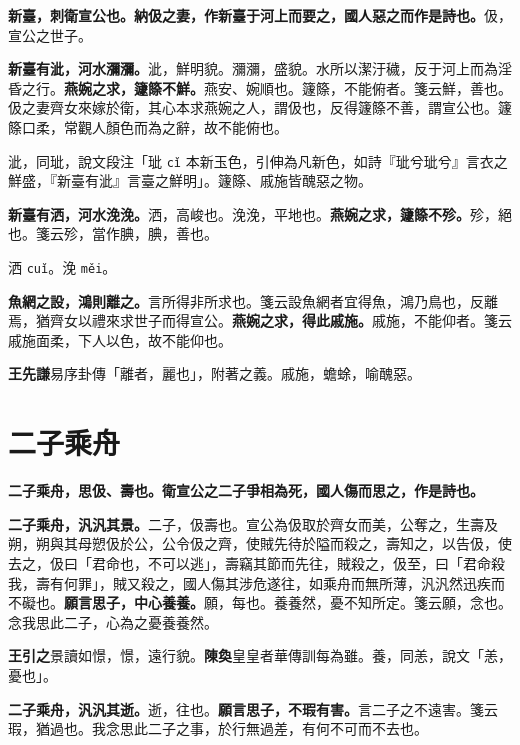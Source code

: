 
\textbf{新臺，刺衛宣公也。納伋之妻，作新臺于河上而要之，國人惡之而作是詩也。}{\footnotesize 伋，宣公之世子。}

\textbf{新臺有泚，河水瀰瀰。}{\footnotesize 泚，鮮明貌。瀰瀰，盛貌。水所以潔汙穢，反于河上而為淫昏之行。}\textbf{燕婉之求，籧篨不鮮。}{\footnotesize 燕安、婉順也。籧篨，不能俯者。箋云鮮，善也。伋之妻齊女來嫁於衛，其心本求燕婉之人，謂伋也，反得籧篨不善，謂宣公也。籧篨口柔，常觀人顏色而為之辭，故不能俯也。}

\begin{quoting}泚，同玼，說文段注「玼 \texttt{cǐ} 本新玉色，引伸為凡新色，如詩『玼兮玼兮』言衣之鮮盛，『新臺有泚』言臺之鮮明」。籧篨、戚施皆醜惡之物。\end{quoting}

\textbf{新臺有洒，河水浼浼。}{\footnotesize 洒，高峻也。浼浼，平地也。}\textbf{燕婉之求，籧篨不殄。}{\footnotesize 殄，絕也。箋云殄，當作腆，腆，善也。}

\begin{quoting}洒 \texttt{cuǐ}。浼 \texttt{měi}。\end{quoting}

\textbf{魚網之設，鴻則離之。}{\footnotesize 言所得非所求也。箋云設魚網者宜得魚，鴻乃鳥也，反離焉，猶齊女以禮來求世子而得宣公。}\textbf{燕婉之求，得此戚施。}{\footnotesize 戚施，不能仰者。箋云戚施面柔，下人以色，故不能仰也。}

\begin{quoting}\textbf{王先謙}易序卦傳「離者，麗也」，附著之義。戚施，蟾蜍，喻醜惡。\end{quoting}

\section{二子乘舟}


\textbf{二子乘舟，思伋、壽也。衛宣公之二子爭相為死，國人傷而思之，作是詩也。}

\textbf{二子乘舟，汎汎其景。}{\footnotesize 二子，伋壽也。宣公為伋取於齊女而美，公奪之，生壽及朔，朔與其母愬伋於公，公令伋之齊，使賊先待於隘而殺之，壽知之，以告伋，使去之，伋曰「君命也，不可以逃」，壽竊其節而先往，賊殺之，伋至，曰「君命殺我，壽有何罪」，賊又殺之，國人傷其涉危遂往，如乘舟而無所薄，汎汎然迅疾而不礙也。}\textbf{願言思子，中心養養。}{\footnotesize 願，每也。養養然，憂不知所定。箋云願，念也。念我思此二子，心為之憂養養然。}

\begin{quoting}\textbf{王引之}景讀如憬，憬，遠行貌。\textbf{陳奐}皇皇者華傳訓每為雖。養，同恙，說文「恙，憂也」。\end{quoting}

\textbf{二子乘舟，汎汎其逝。}{\footnotesize 逝，往也。}\textbf{願言思子，不瑕有害。}{\footnotesize 言二子之不遠害。箋云瑕，猶過也。我念思此二子之事，於行無過差，有何不可而不去也。}


